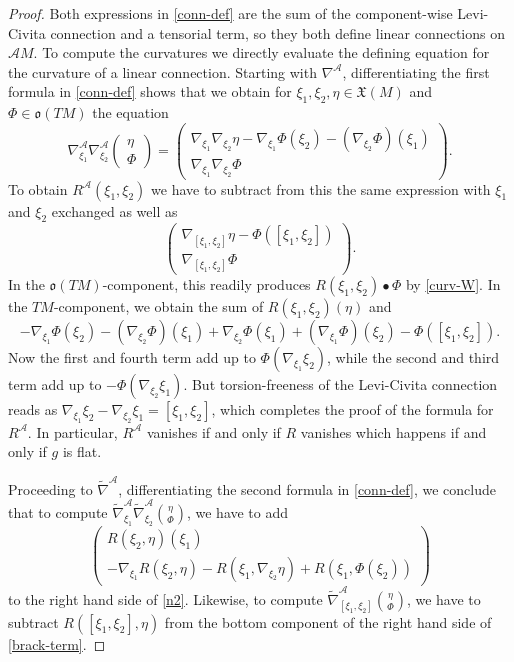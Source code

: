\documentclass[10pt,a4paper]{amsart}
\def\Cal{\mathcal}
\newcommand{\Ph}{\Phi}
\def\frak{\mathfrak}
\newcommand{\tn}{\widetilde{\nabla}}
\begin{document}
\begin{proof}
Both expressions in \eqref{conn-def} are the sum of the component-wise Levi-Civita
connection and a tensorial term, so they both define linear connections on $\Cal
AM$. To compute the curvatures we directly evaluate the defining equation for the
curvature of a linear connection. Starting with $\nabla^{\Cal A}$, differentiating the
first formula in \eqref{conn-def} shows that we obtain for $\xi_1,\xi_2,\eta\in\frak
X(M)$ and $\Ph\in\frak o(TM)$ the equation
\begin{equation}\label{n2}
\nabla^{\Cal A}_{\xi_1}\nabla^{\Cal
  A}_{\xi_2}\begin{pmatrix}\eta\\ \Phi \end{pmatrix}=
\begin{pmatrix}
  \nabla_{\xi_1}\nabla_{\xi_2}\eta-\nabla_{\xi_1}\Phi(\xi_2)-(\nabla_{\xi_2}\Phi)(\xi_1)\\
  \nabla_{\xi_1}\nabla_{\xi_2}\Phi
\end{pmatrix}. 
\end{equation}
To obtain $R^{\Cal A}(\xi_1,\xi_2)$ we have to subtract from this the same expression
with $\xi_1$ and $\xi_2$ exchanged as well as
\begin{equation}\label{brack-term}
  \begin{pmatrix} \nabla_{[\xi_1,\xi_2]}\eta-\Ph([\xi_1,\xi_2])\\
    \nabla_{[\xi_1,\xi_2]}\Phi\end{pmatrix}.
\end{equation}    
In the $\frak o(TM)$-component, this readily produces $R(\xi_1,\xi_2)\bullet \Phi$ by
\eqref{curv-W}. In the $TM$-component, we obtain the sum of $R(\xi_1,\xi_2)(\eta)$
and
\begin{equation}\label{nb}
-\nabla_{\xi_1}\Phi(\xi_2)-(\nabla_{\xi_2}\Phi)(\xi_1)+\nabla_{\xi_2}\Phi(\xi_1)+
(\nabla_{\xi_1}\Phi)(\xi_2)-\Phi([\xi_1,\xi_2]). 
\end{equation}
Now the first and fourth term add up to $\Ph(\nabla_{\xi_1}\xi_2)$, while the second
and third term add up to $-\Ph(\nabla_{\xi_2}\xi_1)$. But torsion-freeness of the
Levi-Civita connection reads as
$\nabla_{\xi_1}\xi_2-\nabla_{\xi_2}\xi_1=[\xi_1,\xi_2]$, which completes the proof of
the formula for $R^{\Cal A}$. In particular, $R^{\Cal A}$ vanishes if and only if $R$
vanishes which happens if and only if $g$ is flat.

Proceeding to $\tn^{\Cal A}$, differentiating the second formula in \eqref{conn-def},
we conclude that to compute $\tn^{\Cal A}_{\xi_1}\tn^{\Cal
  A}_{\xi_2}\binom{\eta}{\Phi}$, we have to add
\begin{equation}\label{tn2}
\begin{pmatrix} R(\xi_2,\eta)(\xi_1) \\ -\nabla_{\xi_1}R(\xi_2,\eta) -
  R(\xi_1,\nabla_{\xi_2}\eta)+R(\xi_1,\Phi(\xi_2)) 
\end{pmatrix}
\end{equation}
  to the right hand side of \eqref{n2}. Likewise, to compute $\tn^{\Cal
    A}_{[\xi_1,\xi_2]}\binom{\eta}{\Phi}$, we have to subtract
  $R([\xi_1,\xi_2],\eta)$ from the bottom component of the right hand side of
  \eqref{brack-term}.


\end{proof}
\end{document}
